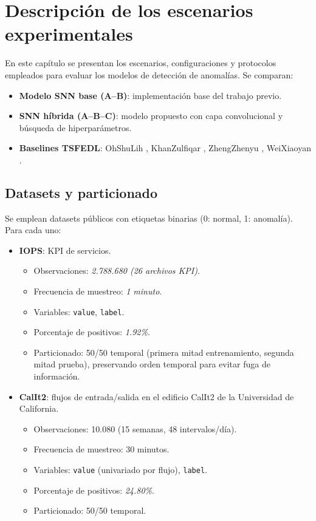 \section{Descripción de los escenarios experimentales}

En este capítulo se presentan los escenarios, configuraciones y protocolos empleados para evaluar los modelos de detección de anomalías. Se comparan:
\begin{itemize}
    \item \textbf{Modelo SNN base (A--B)}: implementación base del trabajo previo.
    \item \textbf{SNN híbrida (A--B--C)}: modelo propuesto con capa convolucional y búsqueda de hiperparámetros.
    \item \textbf{Baselines TSFEDL}: OhShuLih \cite{OHSHU2022}, KhanZulfiqar \cite{KHAN2022}, ZhengZhenyu \cite{ZHENG2022}, WeiXiaoyan \cite{WEI2022}.
\end{itemize}

\subsection{Datasets y particionado}
Se emplean datasets públicos con etiquetas binarias (0: normal, 1: anomalía). Para cada uno:
\begin{itemize}
    \item \textbf{IOPS}: KPI de servicios. 
    \begin{itemize}
        \item Observaciones: \textit{2.788.680 (26 archivos KPI)}.
        \item Frecuencia de muestreo: \textit{1 minuto}.
        \item Variables: \texttt{value}, \texttt{label}.
        \item Porcentaje de positivos: \textit{1.92\%}.
        \item Particionado: 50/50 temporal (primera mitad entrenamiento, segunda mitad prueba), preservando orden temporal para evitar fuga de información.
    \end{itemize}
    \item \textbf{CalIt2}: flujos de entrada/salida en el edificio CalIt2 de la Universidad de California.
    \begin{itemize}
        \item Observaciones: 10.080 (15 semanas, 48 intervalos/día).
        \item Frecuencia de muestreo: 30 minutos.
        \item Variables: \texttt{value} (univariado por flujo), \texttt{label}.
        \item Porcentaje de positivos: \textit{24.80\%}.
        \item Particionado: 50/50 temporal. 
    \end{itemize}
\end{itemize}

